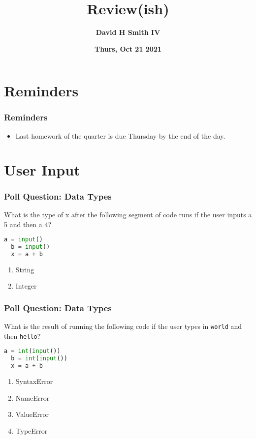 \documentclass[xcolor=table]{beamer}
\title{\textbf{Review(ish)}}
\author{\textbf{David H Smith IV}}
\institute[\textbf{UIUC}]{\textbf{University of Illinois Urbana-Champaign}}
\date{\textbf{Thurs, Oct 21 2021}}
\begin{document}
\frame{\titlepage}

\section{Reminders}

%
%
\begin{frame}
  \frametitle{Reminders}
  \begin{itemize}
    \item Last homework of the quarter is due Thursday by the end of the day.
  \end{itemize}
\end{frame}

\section{User Input}

%
%
%
\begin{frame}[fragile]
  \frametitle{Poll Question: Data Types}
  What is the type of x after the following segment of code runs if the user inputs a 5 and then a 4?
  \begin{lstlisting}[language=Python,autogobble]
  a = input()
  b = input()
  x = a + b\end{lstlisting}
  \hfill
  \begin{enumerate}[A]
    \item String
    \item Integer
  \end{enumerate}
\end{frame}

%
%
%
\begin{frame}[fragile]
  \frametitle{Poll Question: Data Types}
  What is the result of running the following code if the user types in \lstinline|world| and then \lstinline|hello|?
  \begin{lstlisting}[language=Python,autogobble]
  a = int(input())
  b = int(input())
  x = a + b\end{lstlisting}
  \vfill
  \begin{enumerate}[A]
    \item SyntaxError
    \item NameError
    \item ValueError
    \item TypeError
  \end{enumerate}
\end{frame}
\end{document}

